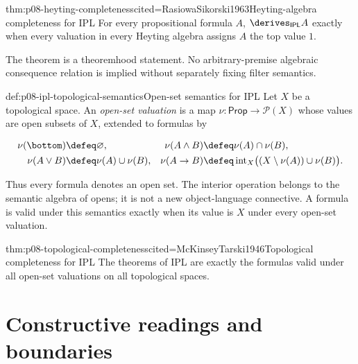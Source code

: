 \begin{hbtheorem}{thm:p08-heyting-completeness}{cited=RasiowaSikorski1963}{Heyting-algebra completeness for IPL}
For every propositional formula \(A\),
\(\derives_{\mathsf{IPL}}A\) exactly when every valuation in every Heyting
algebra assigns \(A\) the top value \(1\).
\end{hbtheorem}

The theorem is a theoremhood statement.  No arbitrary-premise algebraic
consequence relation is implied without separately fixing filter semantics.

\begin{hbdefinition}{def:p08-ipl-topological-semantics}{Open-set semantics for IPL}
Let \(X\) be a topological space.  An \emph{open-set valuation} is a map
\(\nu:\mathsf{Prop}\to\mathcal P(X)\) whose values are open subsets of
\(X\), extended to formulas by

\[
\begin{aligned}
 \nu(\bottom)&\defeq\varnothing,
 &\nu(A\land B)&\defeq\nu(A)\cap\nu(B),\\
 \nu(A\lor B)&\defeq\nu(A)\cup\nu(B),
 &\nu(A\to B)&\defeq
   \operatorname{int}_{X}
   \bigl((X\setminus\nu(A))\cup\nu(B)\bigr).
\end{aligned}
\]

Thus every formula denotes an open set.  The interior operation belongs to the
semantic algebra of opens; it is not a new object-language connective.  A
formula is valid under this semantics exactly when its value is \(X\) under
every open-set valuation.
\end{hbdefinition}

\begin{hbtheorem}{thm:p08-topological-completeness}{cited=McKinseyTarski1946}{Topological completeness for IPL}
The theorems of IPL are exactly the formulas valid under all open-set
valuations on all topological spaces.
\end{hbtheorem}

\section{Constructive readings and boundaries}

